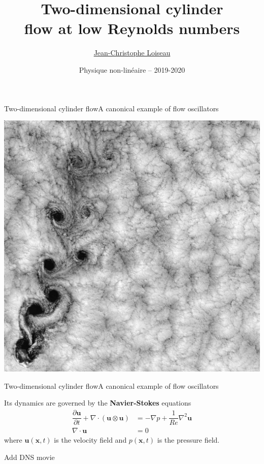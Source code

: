 \documentclass[usenames,dvipsnames,svgnames,10pt,aspectratio=169]{beamer}
\title[Nonlinear physics] %
{
  Two-dimensional cylinder \\
  flow at low Reynolds numbers
}
\author[J.-Ch.~Loiseau] %
{
	\underline{Jean-Christophe Loiseau}
}
\institute[unused]
{
	\url{jean-christophe.loiseau@ensam.eu} \\
	Laboratoire DynFluid \\
	Arts et M\'etiers, France.
}
\date[unused]{Physique non-lin\'eaire -- 2019-2020}
\begin{document}
\titleframe	%


\begin{frame}[t, c]{Two-dimensional cylinder flow}{A canonical example of flow oscillators}
  \begin{minipage}{.48\textwidth}
    \centering
    \includegraphics[width=.75\textwidth]{island}
  \end{minipage}%
  \hfill
  \begin{minipage}{.48\textwidth}
  \end{minipage}
\end{frame}





\begin{frame}[t, c]{Two-dimensional cylinder flow}{A canonical example of flow oscillators}
  \begin{minipage}{.68\textwidth}
    Its dynamics are governed by the \alert{\textbf{Navier-Stokes}} equations
    \[
    \begin{aligned}
      \dfrac{\partial \bm{u}}{\partial t} + \nabla \cdot \left( \bm{u} \otimes \bm{u} \right) & = -\nabla p + \dfrac{1}{Re} \nabla^2 \bm{u} \\
      \nabla \cdot \bm{u} & = 0
    \end{aligned}
    \]
    where $\bm{u}(\bm{x}, t)$ is the velocity field and $p(\bm{x}, t)$ is the pressure field.
  \end{minipage}%
  \hfill
  \begin{minipage}{.28\textwidth}
    Add DNS movie
  \end{minipage}
\end{frame}
\end{document}
